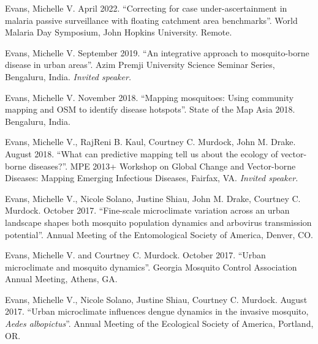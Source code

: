 
\begin{cvitems}
	\bigskip
	\item Evans, Michelle V. April 2022. ``Correcting for case under-ascertainment in malaria passive surveillance with floating catchment area benchmarks''. World Malaria Day Symposium, John Hopkins University. Remote.

	\item Evans, Michelle V. September 2019. ``An integrative approach to mosquito-borne disease in urban areas''. Azim Premji University Science Seminar Series, Bengaluru, India. \textit{Invited speaker.}

	\item Evans, Michelle V. November 2018. ``Mapping mosquitoes: Using community mapping and OSM to identify disease hotspots''. State of the Map Asia 2018. Bengaluru, India.

	\item Evans, Michelle V., RajReni B. Kaul, Courtney C. Murdock, John M. Drake. August 2018. ``What can predictive mapping tell us about the ecology of vector-borne diseases?''. MPE 2013+ Workshop on Global Change and Vector-borne Diseases: Mapping Emerging Infectious Diseases, Fairfax, VA. \textit{Invited speaker.}

	\item Evans, Michelle V., Nicole Solano, Justine Shiau, John M. Drake, Courtney C. Murdock. October 2017. ``Fine-scale microclimate variation across an urban landscape shapes both mosquito population dynamics and arbovirus transmission potential''. Annual Meeting of the Entomological Society of America, Denver, CO.

	\item Evans, Michelle V. and Courtney C. Murdock. October 2017. ``Urban microclimate and mosquito dynamics''. Georgia Mosquito Control Association Annual Meeting, Athens, GA.

	\item Evans, Michelle V., Nicole Solano, Justine Shiau, Courtney C. Murdock. August 2017. ``Urban microclimate influences dengue dynamics in the invasive mosquito, \textit{Aedes albopictus}''. Annual Meeting of the Ecological Society of America, Portland, OR.


\end{cvitems}
